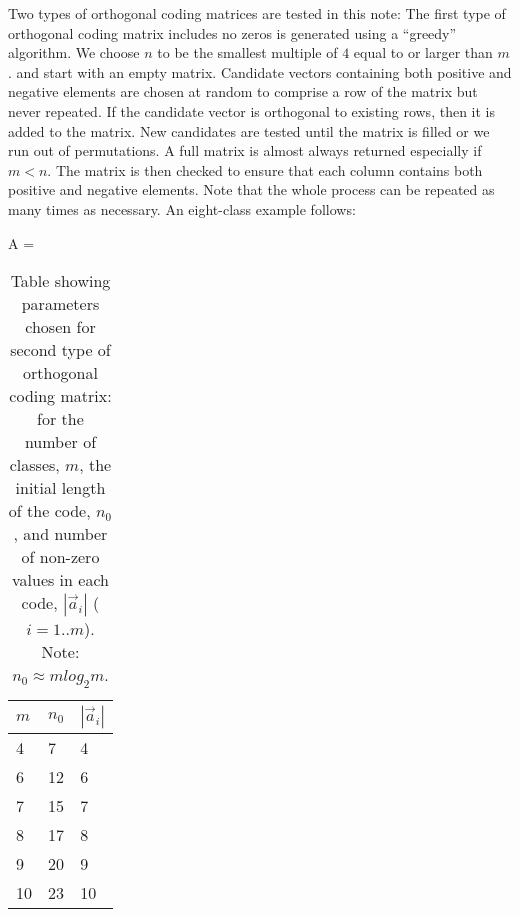 
Two types of orthogonal coding matrices are tested in this note:
The first type of orthogonal coding matrix includes no zeros is generated
using a ``greedy'' algorithm.
We choose $n$ to be the smallest multiple of $4$ equal to or larger than $m$.
and start with an empty matrix.
Candidate vectors containing both positive and negative elements 
are chosen at random to comprise a row of the matrix but never repeated.
If the candidate vector is orthogonal to existing rows, then it is added to the matrix.
New candidates are tested until the matrix is filled or we run out of permutations.
A full matrix is almost always returned especially if $m<n$.
The matrix is then checked to ensure that 
each column contains both positive and negative elements.
Note that the whole process can be repeated as many times as necessary.
An eight-class example follows:
\begin{eqnnon}
	A = 
\end{eqnnon}

\begin{table}
	\caption{Table showing parameters chosen for second type of
	orthogonal coding matrix: for the number of classes, $m$, 
	the initial length of the code, $n_0$, and number of non-zero
	values in each code, $|\vec a_i|$ ($i=1..m$). 
	Note: $n_0 \approx m log_2 m$.}\label{ortho_param}
	\begin{tabular}{l|ll}
		$m$ & $n_0$ & $|\vec a_i|$ \\
		\hline
		4 & 7 & 4 \\
		6 & 12 & 6 \\
		7 & 15 & 7 \\
		8 & 17 & 8 \\
		9 & 20 & 9 \\
		10 & 23 & 10 \\
	\end{tabular}
\end{table}

